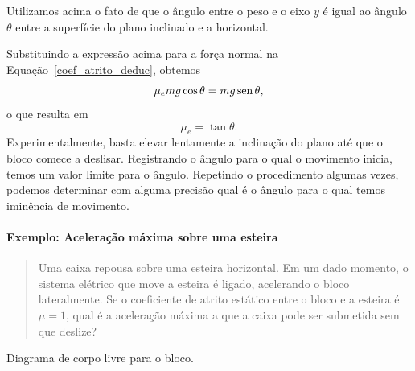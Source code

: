 \noindent{}Utilizamos acima o fato de que o ângulo entre o peso e o eixo $y$ é igual ao ângulo $\theta$ entre a superfície do plano inclinado e a horizontal.

Substituindo a expressão acima para a força normal na Equação~\eqref{coef_atrito_deduc}, obtemos
\begin{equation}
    \mu_e mg \cos\theta = mg \operatorname{sen}\theta,
\end{equation}
%
o que resulta em
\begin{equation}
    \mu_e = \tan\theta.
\end{equation}
%
Experimentalmente, basta elevar lentamente a inclinação do plano até que o bloco comece a deslisar. Registrando o ângulo para o qual o movimento inicia, temos um valor limite para o ângulo. Repetindo o procedimento algumas vezes, podemos determinar com alguma precisão qual é o ângulo para o qual temos iminência de movimento.

\paragraph{Exemplo: Aceleração máxima sobre uma esteira}

\begin{quote}
Uma caixa repousa sobre uma esteira horizontal. Em um dado momento, o sistema elétrico que move a esteira é ligado, acelerando o bloco lateralmente. Se o coeficiente de atrito estático entre o bloco e a esteira é $\mu = 1$, qual é a aceleração máxima a que a caixa pode ser submetida sem que deslize?
\end{quote}

\begin{marginfigure}[5cm]
\centering
{}
\caption{Diagrama de corpo livre para o bloco.\label{Fig:Atrito:ExemploAceleracaoMaximaEsteira2}}
\end{marginfigure}

